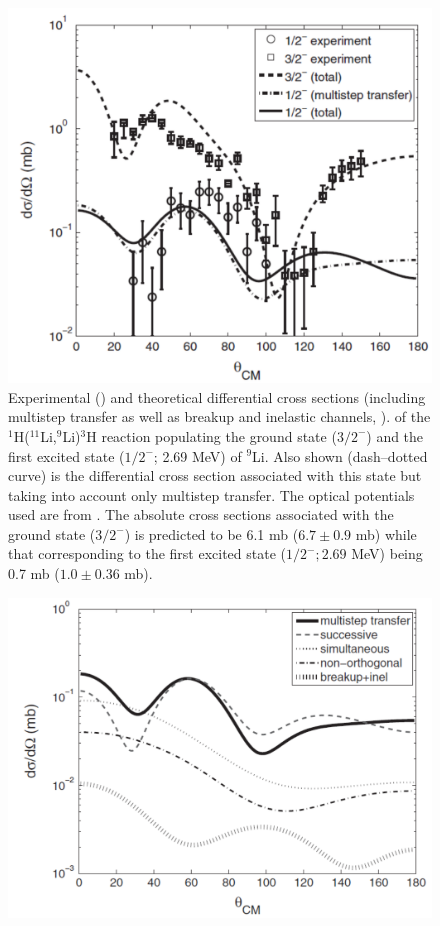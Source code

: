 \begin{subappendices}
    \begin{figure}
    \centerline{\includegraphics*[width=12cm,angle=0]{C8/figsC8/fig8_B_2}}
    	\caption{Experimental (\cite{Tanihata:08}) and theoretical differential cross sections (including multistep transfer as well as breakup and inelastic channels, \cite{Potel:10}).  of the
    	$^1$H($^{11}$Li,$^9$Li)$^3$H  reaction populating the ground state ($3/2^-$) and the first excited state ($1/2^-$; 2.69 MeV) of $^{9}$Li. Also shown (dash--dotted curve) is the differential cross section associated with this state but taking into account only multistep transfer. The optical potentials used are from \citep{Tanihata:08,An:06}. The absolute cross sections associated with the ground state ($3/2^-$) is predicted to be 6.1 mb ($6.7\pm 0.9$ mb) while that corresponding to the first excited state ($1/2^-; 2.69$ MeV) being 0.7 mb ($1.0\pm 0.36$ mb). }\label{fig8_B_2}
    \end{figure}
        \begin{figure}
        \centerline{\includegraphics*[width=12cm,angle=0]{C8/figsC8/fig8_B_3}}

\end{figure}
\end{subappendices}
